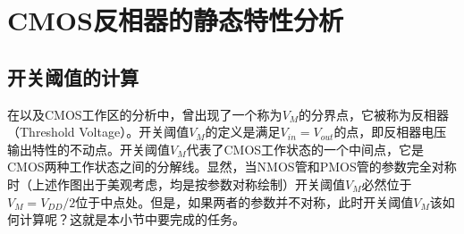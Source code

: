 \section{CMOS反相器的静态特性分析}

\subsection{开关阈值的计算}
在以及CMOS工作区的分析中，曾出现了一个称为$V_M$的分界点，它被称为反相器（Threshold Voltage）。开关阈值$V_M$的定义是满足$V_{in}=V_{out}$的点，即反相器电压输出特性的不动点。开关阈值$V_M$代表了CMOS工作状态的一个中间点，它是CMOS两种工作状态之间的分解线。显然，当NMOS管和PMOS管的参数完全对称时（上述作图出于美观考虑，均是按参数对称绘制）开关阈值$V_{M}$必然位于$V_M=V_{DD}/2$位于中点处。但是，如果两者的参数并不对称，此时开关阈值$V_M$该如何计算呢？这就是本小节中要完成的任务。

